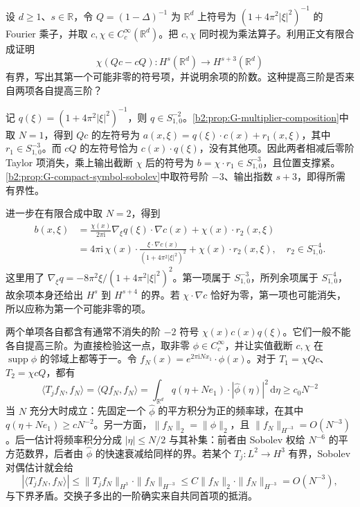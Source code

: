 \begin{exercise}\label{b2:ex:app-G-1}
设 \(d\ge1\)、\(s\in\mathbb R\)，令 \(Q=(1-\Delta)^{-1}\) 为 \(\mathbb R^d\) 上符号为 \((1+4\pi^2|\xi|^2)^{-1}\) 的 Fourier 乘子，并取 \(c,\chi\in C_c^\infty(\mathbb R^d)\)。把 \(c,\chi\) 同时视为乘法算子。利用正文有限合成证明
\[
 \chi(Qc-cQ):H^s(\mathbb R^d)\longrightarrow H^{s+3}(\mathbb R^d)
\]
有界，写出其第一个可能非零的符号项，并说明余项的阶数。这种提高三阶是否来自两项各自提高三阶？
\end{exercise}
\begin{solution}
记 \(q(\xi)=(1+4\pi^2|\xi|^2)^{-1}\)，则 \(q\in S^{-2}_{1,0}\)。\cref{b2:prop:G-multiplier-composition}中取 \(N=1\)，得到 \(Qc\) 的左符号为
\(a(x,\xi)=q(\xi)\cdot c(x)+r_1(x,\xi)\)，其中 \(r_1\in S^{-3}_{1,0}\)。而 \(cQ\) 的左符号恰为 \(c(x)\cdot q(\xi)\)，没有其他项。因此两者相减后零阶 Taylor 项消失，乘上输出截断 \(\chi\) 后的符号为 \(b=\chi\cdot r_1\in S^{-3}_{1,0}\)，且位置支撑紧。\cref{b2:prop:G-compact-symbol-sobolev}中取符号阶 \(-3\)、输出指数 \(s+3\)，即得所需有界性。

进一步在有限合成中取 \(N=2\)，得到
\[
 \begin{aligned}
 b(x,\xi)
 &=\frac{\chi(x)}{2\pi\mathrm i}
       \nabla_\xi q(\xi)\cdot\nabla c(x)+\chi(x)\cdot r_2(x,\xi)\\
 &=4\pi\mathrm i\,\chi(x)\cdot
       \frac{\xi\cdot\nabla c(x)}{(1+4\pi^2|\xi|^2)^2}
       +\chi(x)\cdot r_2(x,\xi),
 \quad r_2\in S^{-4}_{1,0}.
 \end{aligned}
\]
这里用了 \(\nabla_\xi q=-8\pi^2\xi/(1+4\pi^2|\xi|^2)^2\)。第一项属于 \(S^{-3}_{1,0}\)，所列余项属于 \(S^{-4}_{1,0}\)，故余项本身还给出 \(H^s\) 到 \(H^{s+4}\) 的界。若 \(\chi\cdot\nabla c\) 恰好为零，第一项也可能消失，所以应称为第一个可能非零的项。

两个单项各自都含有通常不消失的阶 \(-2\) 符号 \(\chi(x)c(x)q(\xi)\)。它们一般不能各自提高三阶。为直接检验这一点，取非零 \(\phi\in C_c^\infty\)，并让实值截断 \(c,\chi\) 在 \(\operatorname{supp}\phi\) 的邻域上都等于一。令
\(f_N(x)=e^{2\pi\mathrm iNx_1}\cdot\phi(x)\)。对于 \(T_1=\chi Qc\)、\(T_2=\chi cQ\)，都有
\[
 \langle T_jf_N,f_N\rangle
 =\langle Qf_N,f_N\rangle
 =\int_{\mathbb R^d}q(\eta+Ne_1)\cdot|\widehat\phi(\eta)|^2
       \,\mathrm d\eta
 \ge c_0N^{-2}
\]
当 \(N\) 充分大时成立：先固定一个 \(\widehat\phi\) 的平方积分为正的频率球，在其中 \(q(\eta+Ne_1)\ge cN^{-2}\)。另一方面，\(\|f_N\|_2=\|\phi\|_2\)，且 \(\|f_N\|_{H^{-3}}=O(N^{-3})\)。后一估计将频率积分分成 \(|\eta|\le N/2\) 与其补集：前者由 Sobolev 权给 \(N^{-6}\) 的平方范数界，后者由 \(\widehat\phi\) 的快速衰减给同样的界。若某个 \(T_j:L^2\to H^3\) 有界，Sobolev 对偶估计就会给
\[
 |\langle T_jf_N,f_N\rangle|
 \le\|T_jf_N\|_{H^3}\cdot\|f_N\|_{H^{-3}}
 \le C\|f_N\|_2\cdot\|f_N\|_{H^{-3}}
 =O(N^{-3}),
\]
与下界矛盾。交换子多出的一阶确实来自共同首项的抵消。
\end{solution}

